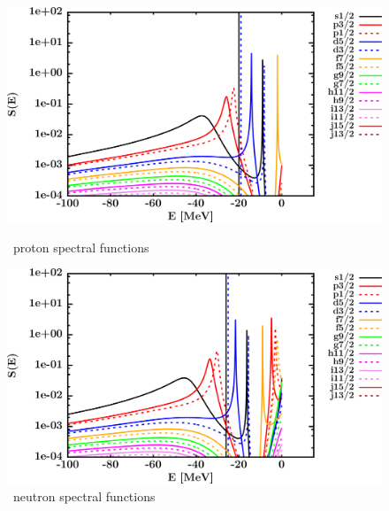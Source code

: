 \begin{figure}[hbtp]
    \centering
    \begin{minipage}{0.42\textwidth}
        \centering
        \includegraphics[width=\textwidth]{figures/ca40_protonSpectralFunctions.png}
        \caption*{\caForty\ proton spectral functions}
        \label{DOMFitData_ca40_proton_spectralFunctions}
    \end{minipage}\hspace{6pt}
    \begin{minipage}{0.42\textwidth}
        \centering
        \includegraphics[width=\linewidth]{figures/ca40_neutronSpectralFunctions.png}
        \caption*{\caForty\ neutron spectral functions}
        \label{DOMFitData_ca40_neutron_spectralFunctions}
    \end{minipage}
\end{figure}
\afterpage{\clearpage}
